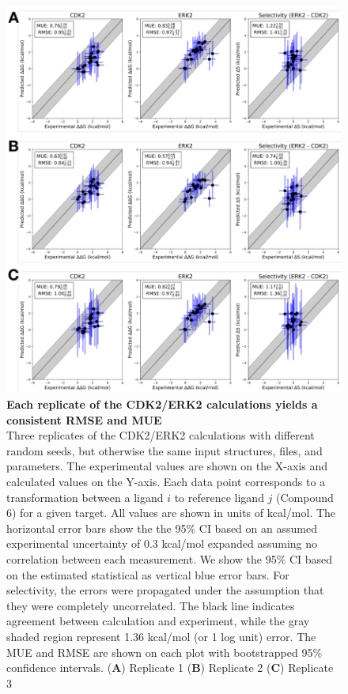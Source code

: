 \documentclass[phd,tocprelim]{cornell}
\begin{document}
\begin{appendices}
	\begin{landscape}
		\begin{figure}[p]
			\centering
			\includegraphics[width=0.46\linewidth]{figures/supp_figure6.pdf}
			\caption[Each replicate of the CDK2/ERK2 calculations yields a consistent RMSE and MUE]{
	{\bf Each replicate of the CDK2/ERK2 calculations yields a consistent RMSE and MUE} \\
Three replicates of the CDK2/ERK2 calculations with different random seeds, but otherwise the same input structures, files, and parameters. The experimental values are shown on the X-axis and calculated values on the Y-axis. Each data point corresponds to a transformation between a ligand $i$ to reference ligand $j$ (Compound 6) for a given target. All values are shown in units of kcal/mol. The horizontal error bars show the the 95\% CI based on an assumed experimental uncertainty of 0.3 kcal/mol\citep{BROWN2009420} expanded assuming no correlation between each measurement. We show the 95\% CI based on the estimated statistical as vertical blue error bars. For selectivity, the errors were propagated under the assumption that they were completely uncorrelated.  The black line indicates agreement between calculation and experiment, while the gray shaded region represent 1.36 kcal/mol (or 1 log unit) error. The MUE and RMSE are shown on each plot with bootstrapped 95$\%$ confidence intervals. ({\bf A}) Replicate 1 ({\bf B}) Replicate 2 ({\bf C}) Replicate 3}
			\label{fig:sup-figure-6}
		\end{figure}
	\end{landscape}
	

\end{appendices}
\end{document}
